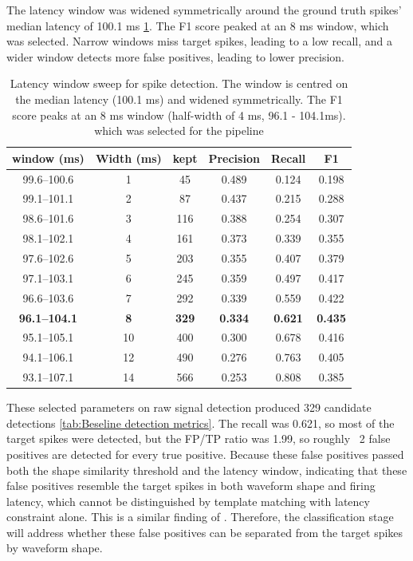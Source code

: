 \documentclass[ %
                    author={Daniel Page},
                supervisor={Dr. Andrew Calway},
                    degree={MSc},
                     title={Some Structural Guidelines for Data Science MSc Theses, Including Those With Long Titles that Run Across Multiple Lines on the Front Page},
                  subtitle={And those including an optional subtitle too, for good measure},
                      type={},
                      year={2021}]{dissertation}
\begin{document}
The latency window was widened symmetrically around the ground truth spikes' median latency of 100.1 ms \ref{tab:latency sweep}. The F1 score peaked at an 8 ms window, which was selected. Narrow windows miss target spikes, leading to a low recall, and a wider window detects more false positives, leading to lower precision. 
\begin{table}[htbp]
    \centering
    \begin{tabular}{cccccc}
    \toprule
    window (ms) & Width (ms) & kept & Precision & Recall & F1 \\
    \midrule
    99.6--100.6 & 1 & 45 & 0.489 & 0.124 & 0.198 \\
    99.1--101.1 & 2 & 87 & 0.437 & 0.215 & 0.288 \\
    98.6--101.6 & 3 & 116 & 0.388 & 0.254 & 0.307 \\
    98.1--102.1 & 4 & 161 & 0.373 & 0.339 & 0.355 \\
    97.6--102.6 & 5 & 203 & 0.355 & 0.407 & 0.379 \\
    97.1--103.1 & 6 & 245 & 0.359 & 0.497 & 0.417 \\
    96.6--103.6 & 7 & 292 & 0.339 & 0.559 & 0.422 \\
    \textbf{96.1--104.1} & \textbf{8} & \textbf{329} & \textbf{0.334} & \textbf{0.621} & \textbf{0.435} \\
    95.1--105.1 & 10 & 400 & 0.300 & 0.678 & 0.416 \\
    94.1--106.1 & 12 & 490 & 0.276 & 0.763 & 0.405 \\
    93.1--107.1 & 14 & 566 & 0.253 & 0.808 & 0.385 \\
    \bottomrule
    \end{tabular}
    \caption{Latency window sweep for spike detection. The window is centred on the median latency (100.1 ms) and widened symmetrically. The F1 score peaks at an 8 ms window (half-width of 4 ms, 96.1 - 104.1ms). which was selected for the pipeline}
    \label{tab:latency sweep}
\end{table}
These selected parameters on raw signal detection produced 329 candidate detections \ref{tab:Beseline detection metrics}. The recall was 0.621, so most of the target spikes were detected, but the FP/TP ratio was 1.99, so roughly ~2 false positives are detected for every true positive. Because these false positives passed both the shape similarity threshold and the latency window, indicating that these false positives resemble the target spikes in both waveform shape and firing latency, which cannot be distinguished by template matching with latency constraint alone. This is a similar finding of \cite{troglio_hybrid_2026}. Therefore, the classification stage will address whether these false positives can be separated from the target spikes by waveform shape.  
\end{document}

